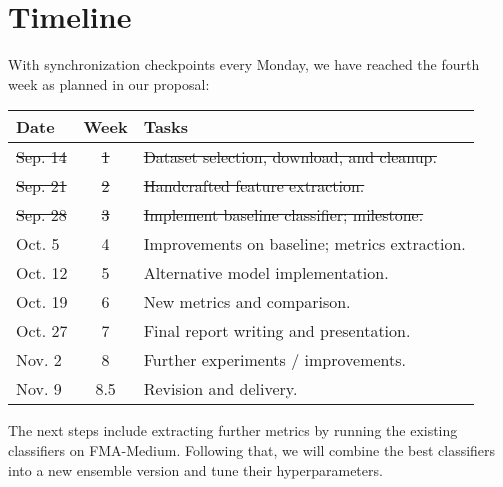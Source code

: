\section{Timeline}

With synchronization checkpoints every Monday, we have reached the fourth week as planned in our proposal:

\begin{table}[h]
    \begin{tabular}{lcl}
    \textbf{Date}    & \multicolumn{1}{l}{\textbf{Week}} & \textbf{Tasks}                                        \\ \hline
    \st{Sep. 14} & \st{1}                        & \st{Dataset selection, download, and cleanup.}                \\
    \st{Sep. 21} & \st{2}                        & \st{Handcrafted feature extraction.}                          \\
    \st{Sep. 28} & \st{3}                        & \st{Implement baseline classifier; milestone.} \\
    Oct. 5  & 4   & Improvements on baseline; metrics extraction. \\
    Oct. 12 & 5   & Alternative model implementation.             \\
    Oct. 19 & 6   & New metrics and comparison.                   \\
    Oct. 27 & 7   & Final report writing and presentation.        \\
    Nov. 2  & 8   & Further experiments / improvements.           \\
    Nov. 9  & 8.5 & Revision and delivery.                       
    \end{tabular}
\end{table}

The next steps include extracting further metrics by running the existing classifiers on FMA-Medium. Following that, we will combine the best classifiers into a new ensemble version and tune their hyperparameters.
